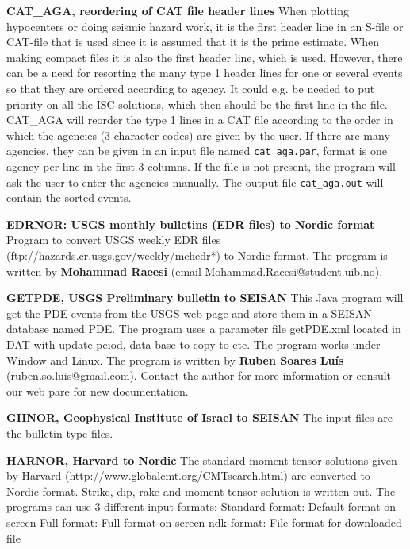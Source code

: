 \textbf{CAT\_AGA, reordering of CAT file header lines}\newline
{}
When plotting hypocenters or doing seismic hazard work, it is the first header line in an S-file or CAT-file that is used since it is assumed that it is the prime estimate. When making compact files it is also the first header line, which is used. However, there can be a need for resorting the many type 1 
header lines for one or several events so that they are ordered according to agency. It could e.g. be needed to put priority on all the ISC solutions, which then should be the first line in the file. CAT\_AGA will reorder the type 1 lines in a CAT file according to the order in which the agencies (3 character codes) are given by the user. If there are many agencies, they can be given in an input file named \texttt{cat\_aga.par}, format is one agency per line in the first 3 columns. If the file is not present, the program will ask the user to enter the agencies manually. 
 The output file \texttt{cat\_aga.out} will contain the sorted events. 

\textbf{EDRNOR: USGS monthly bulletins (EDR files) to Nordic format}\newline
{}
Program to convert USGS weekly EDR files (ftp://hazards.cr.usgs.gov/weekly/mchedr*) to Nordic format. The program is written by \textbf{Mohammad Raeesi} (email Mohammad.Raeesi@student.uib.no). 

\textbf{GETPDE, USGS Preliminary bulletin to SEISAN}\newline
\label{page:getpde}
This Java program will get the PDE events from the USGS web page and store them
in a SEISAN database named PDE. 
The program uses a parameter file getPDE.xml located in DAT with update peiod, data base to copy to etc. The program works under Window and Linux.
The program is written by \textbf{Ruben Soares Lu\'is} (ruben.so.luis@gmail.com). Contact the author for more information or consult our web pare for new documentation. 

\textbf{GIINOR, Geophysical Institute of Israel to SEISAN}\newline
The input files are the bulletin type files.

\textbf{HARNOR, Harvard to Nordic }\newline
The standard moment tensor solutions given by Harvard (\url{http://www.globalcmt.org/CMTsearch.html}) are converted to Nordic format. Strike, dip,  rake  and moment tensor solution is written out.
The programs can use 3 different input formats:
\newline
 Standard format: Default format on screen
\newline Full format: Full format on screen
\newline ndk format: File format for downloaded file

